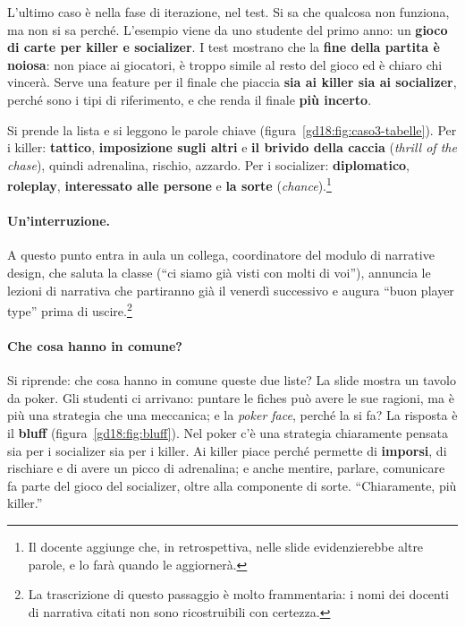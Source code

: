 L'ultimo caso è nella fase di iterazione, nel test. Si sa che qualcosa non funziona,
ma non si sa perché. L'esempio viene da uno studente del primo anno: un
\textbf{gioco di carte per killer e socializer}. I test mostrano che la
\textbf{fine della partita è noiosa}: non piace ai giocatori, è troppo simile al resto
del gioco ed è chiaro chi vincerà. Serve una feature per il finale che piaccia
\textbf{sia ai killer sia ai socializer}, perché sono i tipi di riferimento, e che
renda il finale \textbf{più incerto}.

Si prende la lista e si leggono le parole chiave (figura~\ref{gd18:fig:caso3-tabelle}).
Per i killer: \textbf{tattico}, \textbf{imposizione sugli altri} e \textbf{il brivido
della caccia} (\emph{thrill of the chase}), quindi adrenalina, rischio, azzardo. Per i
socializer: \textbf{diplomatico}, \textbf{roleplay}, \textbf{interessato alle
persone} e \textbf{la sorte} (\emph{chance}).\footnote{Il docente aggiunge che, in
retrospettiva, nelle slide evidenzierebbe altre parole, e lo farà quando le
aggiornerà.}

\paragraph{Un'interruzione.} A questo punto entra in aula un collega, coordinatore del
modulo di narrative design, che saluta la classe (``ci siamo già visti con molti di
voi''), annuncia le lezioni di narrativa che partiranno già il venerdì successivo e
augura ``buon player type'' prima di uscire.\footnote{La trascrizione di questo
passaggio è molto frammentaria: i nomi dei docenti di narrativa citati non sono
ricostruibili con certezza.}


\paragraph{Che cosa hanno in comune?} Si riprende: che cosa hanno in comune queste due
liste? La slide mostra un tavolo da poker. Gli studenti ci arrivano: puntare le fiches
può avere le sue ragioni, ma è più una strategia che una meccanica; e la
\emph{poker face}, perché la si fa? La risposta è il \textbf{bluff}
(figura~\ref{gd18:fig:bluff}). Nel poker c'è una strategia chiaramente pensata sia per
i socializer sia per i killer. Ai killer piace perché permette di \textbf{imporsi}, di
rischiare e di avere un picco di adrenalina; e anche mentire, parlare, comunicare fa
parte del gioco del socializer, oltre alla componente di sorte. ``Chiaramente, più
killer.''

